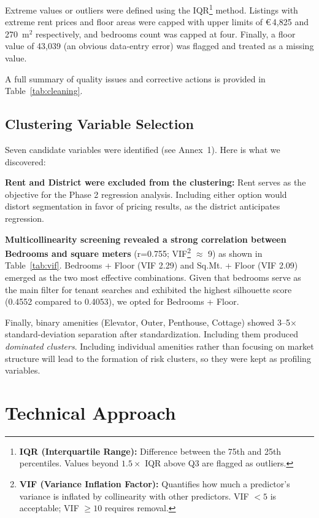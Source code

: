 \documentclass[10pt,a4paper,twocolumn]{article}
\newcommand{\eur}[1]{€\,#1}
\begin{document}
Extreme values or outliers were defined using the IQR\footnote{\textbf{IQR (Interquartile Range):} Difference between the 75th and 25th percentiles. Values beyond $1.5\times$ IQR above Q3 are flagged as outliers.} method. Listings with extreme rent prices and floor areas were capped with upper limits of \eur{4,825} and 270~m$^{2}$ respectively, and bedrooms count was capped at four. Finally, a floor value of 43,039 (an obvious data-entry error) was flagged and treated as a missing value.

A full summary of quality issues and corrective actions is provided in Table~\ref{tab:cleaning}.
\subsection{Clustering Variable Selection}

Seven candidate variables were identified (see Annex~1). Here is what we discovered:

\textbf{Rent and District were excluded from the clustering:} Rent serves as the objective for the Phase 2 regression analysis. Including either option would distort segmentation in favor of pricing results, as the district anticipates regression. 

\textbf{Multicollinearity screening revealed a strong correlation between Bedrooms and square meters} (r=0.755; VIF\footnote{\textbf{VIF (Variance Inflation Factor):} Quantifies how much a predictor's variance is inflated by collinearity with other predictors. VIF $<5$ is acceptable; VIF $\geq10$ requires removal.} $\approx$ 9) as shown in Table~\ref{tab:vif}. Bedrooms + Floor (VIF 2.29) and Sq.Mt. + Floor (VIF 2.09) emerged as the two most effective combinations. Given that bedrooms serve as the main filter for tenant searches and exhibited the highest silhouette score (0.4552 compared to 0.4053), we opted for Bedrooms + Floor.

Finally, binary amenities (Elevator, Outer, Penthouse, Cottage) showed 3--5$\times$ standard-deviation separation after standardization. Including them produced \textit{dominated clusters}. Including individual amenities rather than focusing on market structure will lead to the formation of risk clusters, so they were kept as profiling variables.

\section{Technical Approach}
\end{document}
